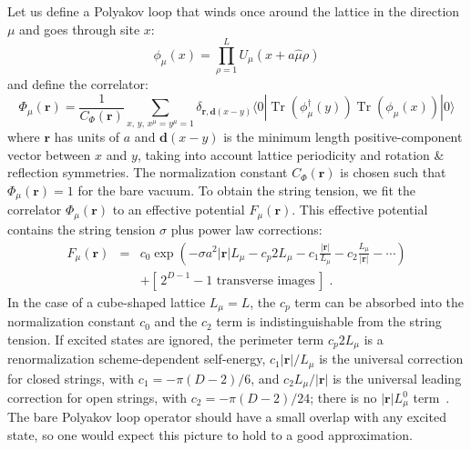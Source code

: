 \documentclass[preprint,aps,prd]{revtex4-2}
\newcommand{\be}{\begin{equation}}
\newcommand{\eq}{\end{equation}}
\DeclareMathOperator{\Tr}{Tr}
\begin{document}
Let us define a Polyakov loop that winds once around the lattice
in the direction $\mu$ and goes through site $x$:
\be
         \phi_\mu(x)= \prod_{\rho=1}^L U_\mu(x+a \hat{\mu} \rho)
\eq
and define the correlator:
\be
\Phi_\mu(\mathbf{r}) = \frac{1}{C_\Phi(\mathbf{r})} \sum_{x, \,y,\, x^\mu = y^\mu =1}
           \delta_{\mathbf{r},\mathbf{d}(x-y)}
           \langle 0 | \Tr\left(\phi_\mu^\dagger(y)\right)
            \Tr\left(\phi_\mu(x)\right) |0\rangle
           \label{pcorr}
\eq
%
where $\mathbf{r}$ has units of $a$ and
$\mathbf{d}(x-y)$ is the minimum length positive-component
vector between $x$ and $y$, taking into account lattice periodicity
and rotation \& reflection symmetries.
The normalization constant $C_\Phi(\mathbf{r})$ is chosen such that
$\Phi_\mu(\mathbf{r})=1$ for the bare vacuum.
To obtain the string tension,
we fit the correlator $\Phi_\mu(\mathbf{r})$ to an effective
potential $F_\mu(\mathbf{r})$.
This effective potential contains the string tension $\sigma$
plus power law corrections:
%
\begin{eqnarray}
         F_\mu(\mathbf{r}) &=& c_0 \exp\left(
         -\sigma a^2 \left|\mathbf{r}\right| L_\mu
         - c_p 2 L_\mu
         - c_1 \frac{\left|\mathbf{r}\right|}{L_\mu}
         - c_2 \frac{L_\mu}{\left|\mathbf{r}\right|}
         - \cdots \right)\nonumber\\
         & & + \left[\,\mbox{$2^{D-1}-1$ transverse images}\,\right]
         \; .  \label{stringmodel}
\end{eqnarray}
%
In the case of a cube-shaped lattice $L_\mu = L$, the $c_p$ term can
be absorbed into the normalization constant $c_0$ and
the $c_2$ term is indistinguishable from the string tension.
If excited states are ignored, the perimeter term $c_p 2 L_\mu$ is a
renormalization scheme-dependent self-energy,
$c_1 \left|\mathbf{r}\right|/L_\mu$ is the universal correction
for closed strings, with $c_1 = -\pi (D-2)/6$, and
$c_2 L_\mu/\left|\mathbf{r}\right|$ is the universal leading correction
for open strings, with $c_2 = -\pi (D-2)/24$; there is no
$\left|\mathbf{r}\right| L_\mu^0$
term~\cite{luscher_anomalies_1980,luscher_quark_2002,aharony_effective_2013}.
The bare Polyakov loop operator should have a small overlap with
any excited state, so one would expect this picture to hold to a
good approximation.
\end{document}
